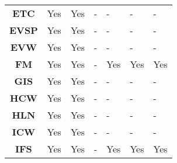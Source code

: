 \begin{table}[ht!]
\begin{tabular}{cllllll}
\textbf{ETC}         & Yes                                 & Yes                                 & -                                       & -                                        & -                                         & -                                         \\
\textbf{EVSP}        & Yes                                 & Yes                                 & -                                       & -                                        & -                                         & -                                         \\
\textbf{EVW}         & Yes                                 & Yes                                 & -                                       & -                                        & -                                         & -                                         \\
\textbf{FM}          & Yes                                 & Yes                                 & -                                       & Yes                                      & Yes                                       & Yes                                       \\
\textbf{GIS}         & Yes                                 & Yes                                 & -                                       & -                                        & -                                         & -                                         \\
\textbf{HCW}         & Yes                                 & Yes                                 & -                                       & -                                        & -                                         & -                                         \\
\textbf{HLN}         & Yes                                 & Yes                                 & -                                       & -                                        & -                                         & -                                         \\
\textbf{ICW}         & Yes                                 & Yes                                 & -                                       & -                                        & -                                         & -                                         \\
\textbf{IFS}         & Yes                                 & Yes                                 & -                                       & Yes                                      & Yes                                       & Yes                                       \\

\end{tabular}
\end{table}
